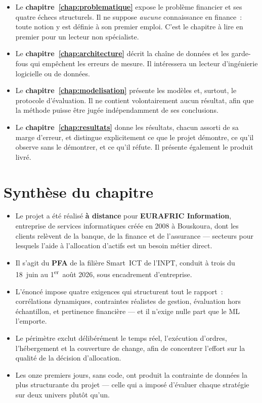 \begin{itemize}
  \item Le \textbf{chapitre~\ref{chap:problematique}} expose le problème
        financier et ses quatre échecs structurels. Il ne suppose \emph{aucune}
        connaissance en finance~: toute notion y est définie à son premier
        emploi. C'est le chapitre à lire en premier pour un lecteur non
        spécialiste.
  \item Le \textbf{chapitre~\ref{chap:architecture}} décrit la chaîne de données
        et les garde-fous qui empêchent les erreurs de mesure. Il intéressera un
        lecteur d'ingénierie logicielle ou de données.
  \item Le \textbf{chapitre~\ref{chap:modelisation}} présente les modèles et,
        surtout, le protocole d'évaluation. Il ne contient volontairement aucun
        résultat, afin que la méthode puisse être jugée indépendamment de ses
        conclusions.
  \item Le \textbf{chapitre~\ref{chap:resultats}} donne les résultats, chacun
        assorti de sa marge d'erreur, et distingue explicitement ce que le projet
        démontre, ce qu'il observe sans le démontrer, et ce qu'il réfute. Il
        présente également le produit livré.
\end{itemize}

\section*{Synthèse du chapitre}

\begin{itemize}
  \item Le projet a été réalisé \textbf{à distance} pour
        \textbf{EURAFRIC Information}, entreprise de
        services informatiques créée en 2008 à Bouskoura, dont les clients
        relèvent de la banque, de la finance et de l'assurance — secteurs pour
        lesquels l'aide à l'allocation d'actifs est un besoin métier direct.
  \item Il s'agit du \textbf{PFA} de la filière Smart~ICT de l'INPT, conduit à
        trois du 18~juin au 1\textsuperscript{er}~août 2026, sous encadrement
        d'entreprise.
  \item L'énoncé impose quatre exigences qui structurent tout le rapport~:
        corrélations dynamiques, contraintes réalistes de gestion, évaluation
        hors échantillon, et pertinence financière — et il n'exige nulle part que
        le ML l'emporte.
  \item Le périmètre exclut délibérément le temps réel, l'exécution d'ordres,
        l'hébergement et la couverture de change, afin de concentrer l'effort sur
        la qualité de la décision d'allocation.
  \item Les onze premiers jours, sans code, ont produit la contrainte de données
        la plus structurante du projet — celle qui a imposé d'évaluer chaque
        stratégie sur deux univers plutôt qu'un.
\end{itemize}

